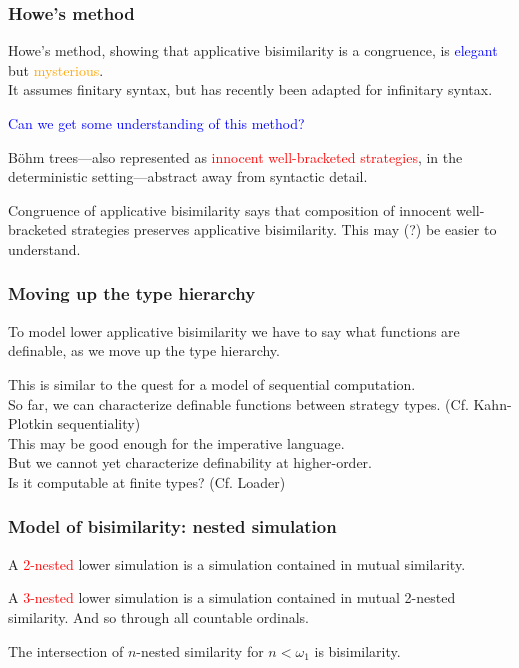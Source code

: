 \documentclass{beamer}
\newcommand{\red}[1]{\textcolor{red}{#1}}
\newcommand{\blue}[1]{\textcolor{blue}{#1}}
\begin{document}
\begin{frame}\frametitle{Howe's method}

Howe's method, showing that applicative bisimilarity is a congruence, is \blue{elegant} but \textcolor{orange}{mysterious}. \\
\medskip
It assumes finitary syntax, but has recently been adapted for infinitary syntax. \\

\medskip \pause

\blue{Can we get some understanding of this method?} \\

\medskip 

B\"{o}hm trees---also represented as \red{innocent well-bracketed strategies}, in the deterministic setting---abstract away from syntactic detail.   \\

\medskip
 
Congruence of applicative bisimilarity says that composition of innocent well-bracketed strategies preserves applicative bisimilarity.  This may (?) be easier to understand.
  
\end{frame}


\begin{frame}\frametitle{Moving up the type hierarchy}
  
To model lower applicative bisimilarity we have to say what functions are definable, as we move up the type hierarchy. \\
\medskip

This is similar to the quest for a model of sequential computation.  \\
\medskip
So far, we can characterize definable functions between strategy types.  (Cf. Kahn-Plotkin sequentiality) \\

\medskip
This may be good enough for the imperative language. \\
\medskip
But we cannot yet characterize definability at higher-order.   \\
\medskip
Is it computable at finite types?  (Cf. Loader)

\end{frame}

\begin{frame}\frametitle{Model of bisimilarity: nested simulation}

A \red{2-nested} lower simulation is a simulation contained in mutual similarity.  \\
\medskip
 
A \red{3-nested} lower simulation is a simulation contained in mutual 2-nested similarity.  And so through all countable ordinals. \\
\medskip

The intersection of $n$-nested similarity for $n < \omega_{1}$ is bisimilarity.

\end{frame}
\end{document}
